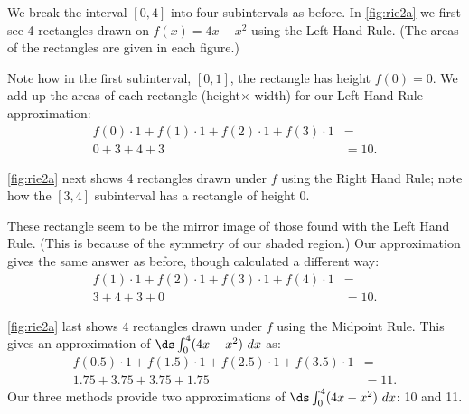 {We break the interval $[0,4]$ into four subintervals as before. In \autoref{fig:rie2a} we first see 4 rectangles drawn on $f(x) = 4x-x^2$ using the Left Hand Rule. (The areas of the rectangles are given in each figure.)


Note how in the first subinterval, $[0,1]$, the rectangle has height $f(0)=0$. We add up the areas of each rectangle (height$\times$ width) for our Left Hand Rule approximation:
\begin{align*}
 f(0)\cdot 1 + f(1)\cdot 1+ f(2)\cdot 1+f(3)\cdot 1 &=\\
	0+3+4+3&= 10.
\end{align*}
	
\autoref{fig:rie2a} next shows 4 rectangles drawn under $f$ using the Right Hand Rule; note how the $[3,4]$ subinterval has a rectangle of height 0. 


These rectangle seem to be the mirror image of those found with the Left Hand Rule. (This is because of the symmetry of our shaded region.) Our approximation gives the same answer as before, though calculated a different way:
\begin{align*}
 f(1)\cdot 1 + f(2)\cdot 1+ f(3)\cdot 1+f(4)\cdot 1 &=\\
	3+4+3+0&= 10.
\end{align*}

\autoref{fig:rie2a} last shows 4 rectangles drawn under $f$ using the Midpoint Rule.
This gives an approximation of $\ds\int_0^4(4x-x^2)\ dx$ as:
\begin{align*} f(0.5)\cdot 1 + f(1.5)\cdot 1+ f(2.5)\cdot 1+f(3.5)\cdot 1 &=\\
	1.75+3.75+3.75+1.75&= 11.
\end{align*}
Our three methods provide two approximations of $\ds\int_0^4(4x-x^2)\ dx$: 10 and 11.}

